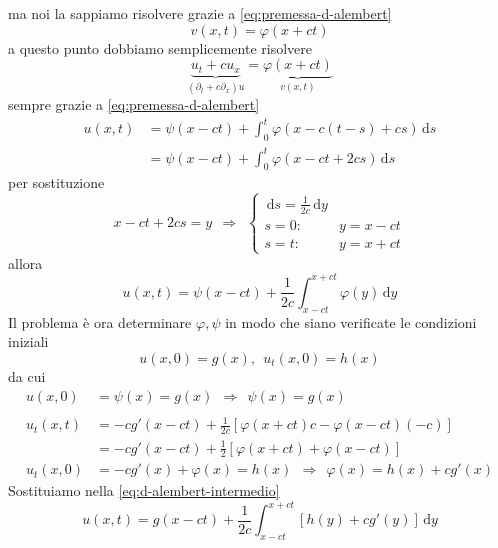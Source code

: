 \documentclass[10pt,a4paper,twoside,openright]{book}
\newcommand{\de}{\,\mathrm d}
\newcommand{\dy}{\de y}
\newcommand{\ds}{\de s}
\begin{document}
ma noi la sappiamo risolvere grazie a \eqref{eq:premessa-d-alembert}
\begin{equation*}
    v(x,t) =\varphi (x+ct)
\end{equation*}
a questo punto dobbiamo semplicemente risolvere
\begin{equation*}
    \underbrace{u_{t} +cu_{x}}_{(\partial _{t} +c\partial _{x}) u} =\underbrace{\varphi (x+ct)}_{v(x,t)}
\end{equation*}
sempre grazie a \eqref{eq:premessa-d-alembert}
\begin{align*}
    u(x,t) & =\psi (x-ct) +\int ^{t}_{0} \varphi (x-c(t-s) +cs) \ds \\
           & =\psi (x-ct) +\int ^{t}_{0} \varphi (x-ct+2cs) \ds
\end{align*}
per sostituzione
\begin{equation*}
    x-ct+2cs=y\ \ \Rightarrow \ \ \begin{cases}
        \ds=\frac{1}{2c} \dy &        \\
        s=0:                 & y=x-ct \\
        s=t:                 & y=x+ct
    \end{cases}
\end{equation*}
allora
\begin{equation}
    u(x,t) =\psi (x-ct) +\frac{1}{2c}\int ^{x+ct}_{x-ct} \varphi (y) \dy
    \label{eq:d-alembert-intermedio}
\end{equation}
Il problema è ora determinare $\varphi ,\psi $ in modo che siano verificate le condizioni iniziali
\begin{equation*}
    u(x,0) =g(x) ,\ \ u_{t}(x,0) =h(x)
\end{equation*}
da cui
\begin{align*}
    u(x,0)     & =\psi (x) =g(x) \ \ \Rightarrow \ \ \boxed{\psi (x) =g(x)}                        \\
               &                                                                                   \\
    u_{t}(x,t) & =-cg'(x-ct) +\frac{1}{2c}[ \varphi (x+ct) c-\varphi (x-ct)(-c)]                   \\
               & =-cg'(x-ct) +\frac{1}{2}[ \varphi (x+ct) +\varphi (x-ct)]                         \\
    u_{t}(x,0) & =-cg'(x) +\varphi (x) =h(x) \ \ \Rightarrow \ \ \boxed{\varphi (x) =h(x) +cg'(x)}
\end{align*}
Sostituiamo nella \eqref{eq:d-alembert-intermedio}
\begin{equation*}
    u(x,t) =g(x-ct) +\frac{1}{2c}\int ^{x+ct}_{x-ct}[ h(y) +cg'(y)] \dy
\end{equation*}
\end{document}
